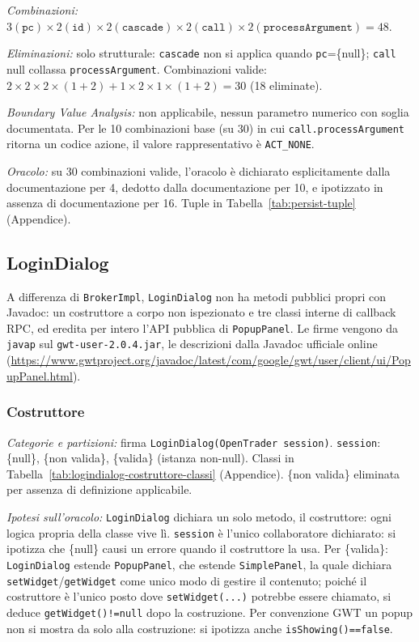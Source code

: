 \textit{Combinazioni:} $3 (\texttt{pc}) \times 2 (\texttt{id}) \times 2 (\texttt{cascade}) \times
2 (\texttt{call}) \times 2 (\texttt{processArgument}) = 48$.

\textit{Eliminazioni:} solo strutturale: \texttt{cascade} non si applica quando
\texttt{pc}=\{null\}; \texttt{call} null collassa \texttt{processArgument}. Combinazioni valide:
$2 \times 2 \times 2 \times (1+2) + 1 \times 2 \times 1 \times (1+2) = 30$ (18 eliminate).

\textit{Boundary Value Analysis:} non applicabile, nessun parametro numerico con soglia
documentata. Per le 10 combinazioni base (su 30) in cui \texttt{call.processArgument} ritorna un
codice azione, il valore rappresentativo è \texttt{ACT\_NONE}.

\textit{Oracolo:} su 30 combinazioni valide, l'oracolo è dichiarato esplicitamente dalla
documentazione per 4, dedotto dalla documentazione per 10, e ipotizzato in assenza di
documentazione per 16. Tuple in Tabella~\ref{tab:persist-tuple} (Appendice).

\subsection{LoginDialog}

A differenza di \texttt{BrokerImpl}, \texttt{LoginDialog} non ha metodi pubblici propri con
Javadoc: un costruttore a corpo non ispezionato e tre classi interne di callback RPC, ed
eredita per intero l'API pubblica di \texttt{PopupPanel}. Le firme
vengono da \texttt{javap} sul \texttt{gwt-user-2.0.4.jar}, le descrizioni dalla Javadoc ufficiale online
(\url{https://www.gwtproject.org/javadoc/latest/com/google/gwt/user/client/ui/PopupPanel.html}).

\subsubsection{Costruttore}

\textit{Categorie e partizioni:} firma \texttt{LoginDialog(OpenTrader session)}.
\texttt{session}: \{null\}, \{non valida\}, \{valida\} (istanza non-null). Classi in
Tabella~\ref{tab:logindialog-costruttore-classi} (Appendice). \{non valida\} eliminata per
assenza di definizione applicabile.

\textit{Ipotesi sull'oracolo:} \texttt{LoginDialog} dichiara un solo metodo, il costruttore:
ogni logica propria della classe vive lì. \texttt{session} è l'unico collaboratore dichiarato:
si ipotizza che \{null\} causi un errore quando il costruttore la usa. Per \{valida\}:
\texttt{LoginDialog} estende \texttt{PopupPanel}, che estende \texttt{SimplePanel}, la quale
dichiara \texttt{setWidget}/\texttt{getWidget} come unico modo di gestire il contenuto; poiché
il costruttore è l'unico posto dove \texttt{setWidget(...)} potrebbe essere chiamato, si deduce
\texttt{getWidget()!=null} dopo la costruzione. Per convenzione GWT un popup non si mostra da
solo alla costruzione: si ipotizza anche \texttt{isShowing()==false}.

